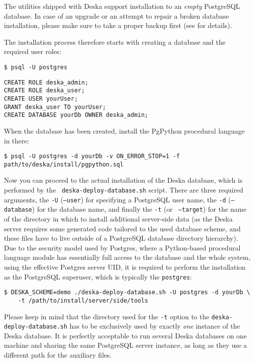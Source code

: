 \documentclass[deska]{subfiles}
\begin{document}
The utilities shipped with Deska support installation to an {\em empty} PostgreSQL database.  In case of an upgrade or
an attempt to repair a broken database installation, please make sure to take a proper backup first (see
 for details).

The installation process therefore starts with creating a database and the required user roles:

\begin{verbatim}
$ psql -U postgres
\end{verbatim}
\begin{verbatim}
CREATE ROLE deska_admin;
CREATE ROLE deska_user;
CREATE USER yourUser;
GRANT deska_user TO yourUser;
CREATE DATABASE yourDb OWNER deska_admin;
\end{verbatim}

When the database has been created, install the PgPython procedural language in there:

\begin{verbatim}
$ psql -U postgres -d yourDb -v ON_ERROR_STOP=1 -f path/to/deska/install/pgpython.sql
\end{verbatim}

Now you can proceed to the actual installation of the Deska database, which is performed by the {\tt
deska-deploy-database.sh} script.  There are three required arguments, the {\tt -U} ({\tt --user}) for specifying a
PostgreSQL user name, the {\tt -d} ({\tt --database}) for the database name, and finally the {\tt -t} (or {\tt
--target}) for the name of the directory in which to install additional server-side data (as the Deska server requires
some generated code tailored to the used database scheme, and these files have to live outside of a PostgreSQL database
directory hierarchy).  Due to the security model used by Postgres, where a Python-based procedural language module has
essentially full access to the database and the whole system, using the effective Postgres server UID, it is required to
perform the installation as the PostgreSQL superuser, which is typically the {\tt postgres}:

\begin{verbatim}
$ DESKA_SCHEME=demo ./deska-deploy-database.sh -U postgres -d yourDb \
    -t /path/to/install/server/side/tools
\end{verbatim}

Please keep in mind that the directory used for the {\tt -t} option to the {\tt deska-deploy-database.sh} has to be
exclusively used by exactly {\em one} instance of the Deska database.  It is perfectly acceptable to run several Deska
databases on one machine and sharing the same PostgreSQL server instance, as long as they use a different path for the
auxiliary files.
\end{document}
